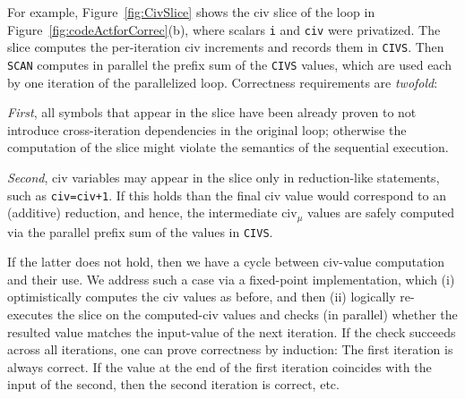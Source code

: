 \documentclass{sig-alternate}
\begin{document}
For example, Figure~\ref{fig:CivSlice} shows the {\sc civ} slice of the loop
in Figure~\ref{fig:codeActforCorrec}(b), where scalars {\tt i} and {\tt civ}
were privatized. The slice computes the per-iteration {\sc civ} increments 
and records them in {\tt CIVS}. Then {\tt SCAN}
computes in parallel the prefix sum of the {\tt CIVS} values, 
which are used each by one iteration of the parallelized loop.
%
Correctness requirements are {\em twofold}:  

{\em First}, all symbols that appear in the slice have been already proven 
to not introduce cross-iteration dependencies in the original loop; otherwise 
the computation of the slice might violate the semantics of the sequential execution. 

{\em Second}, {\sc civ} variables may appear in the slice only in reduction-like statements, 
such as {\tt civ=civ+1}.
If this holds than the final {\sc civ} value would correspond to an (additive) reduction, 
and hence, the intermediate {\sc civ}$_\mu$ values are safely computed via the parallel 
prefix sum of the values in {\tt CIVS}. 

If the latter does not hold, %
then we have a cycle between {\sc civ}-value computation and their use.   
We address such a case via a fixed-point implementation,
which (i) optimistically computes the {\sc civ} values as before, and then (ii) logically 
re-executes the slice on the computed-{\sc civ} values and checks (in parallel) 
whether the resulted value matches the input-value of the next iteration. 
%
If the check succeeds across all iterations, one can prove correctness by induction:
The first iteration is always correct. If the value at the end of the first iteration 
coincides with the input of the second, then the second iteration 
is correct, etc.%

\end{document}
